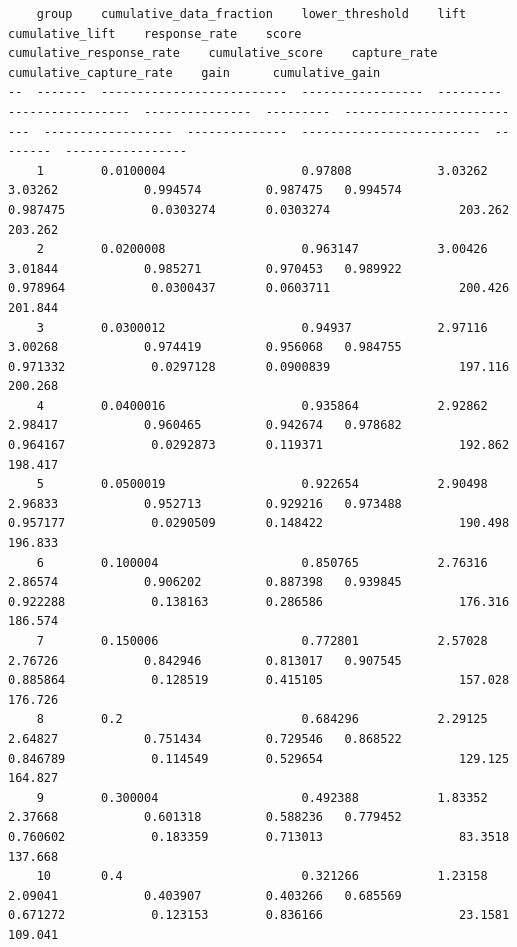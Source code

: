\documentclass[11pt]{article}
\begin{document}
    
    \begin{verbatim}
    group    cumulative_data_fraction    lower_threshold    lift       cumulative_lift    response_rate    score      cumulative_response_rate    cumulative_score    capture_rate    cumulative_capture_rate    gain      cumulative_gain
--  -------  --------------------------  -----------------  ---------  -----------------  ---------------  ---------  --------------------------  ------------------  --------------  -------------------------  --------  -----------------
    1        0.0100004                   0.97808            3.03262    3.03262            0.994574         0.987475   0.994574                    0.987475            0.0303274       0.0303274                  203.262   203.262
    2        0.0200008                   0.963147           3.00426    3.01844            0.985271         0.970453   0.989922                    0.978964            0.0300437       0.0603711                  200.426   201.844
    3        0.0300012                   0.94937            2.97116    3.00268            0.974419         0.956068   0.984755                    0.971332            0.0297128       0.0900839                  197.116   200.268
    4        0.0400016                   0.935864           2.92862    2.98417            0.960465         0.942674   0.978682                    0.964167            0.0292873       0.119371                   192.862   198.417
    5        0.0500019                   0.922654           2.90498    2.96833            0.952713         0.929216   0.973488                    0.957177            0.0290509       0.148422                   190.498   196.833
    6        0.100004                    0.850765           2.76316    2.86574            0.906202         0.887398   0.939845                    0.922288            0.138163        0.286586                   176.316   186.574
    7        0.150006                    0.772801           2.57028    2.76726            0.842946         0.813017   0.907545                    0.885864            0.128519        0.415105                   157.028   176.726
    8        0.2                         0.684296           2.29125    2.64827            0.751434         0.729546   0.868522                    0.846789            0.114549        0.529654                   129.125   164.827
    9        0.300004                    0.492388           1.83352    2.37668            0.601318         0.588236   0.779452                    0.760602            0.183359        0.713013                   83.3518   137.668
    10       0.4                         0.321266           1.23158    2.09041            0.403907         0.403266   0.685569                    0.671272            0.123153        0.836166                   23.1581   109.041

\end{verbatim}
\end{document}
